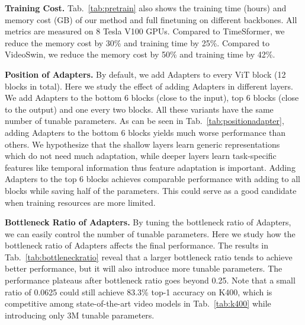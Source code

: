 \documentclass{article} \usepackage{iclr2023_conference,times}
\begin{document}
	\textbf{Training Cost.} Tab.\ \ref{tab:pretrain} also shows the training time (hours) and memory cost (GB) of our method and full finetuning on different backbones. All metrics are measured on 8 Tesla V100 GPUs. Compared to TimeSformer, we reduce the memory cost by 30\% and training time by 25\%. Compared to VideoSwin, we reduce the memory cost by 50\% and training time by 42\%.


\textbf{Position of Adapters.} By default, we add Adapters to every ViT block (12 blocks in total). Here we study the effect of adding Adapters in different layers. We add Adapters to the bottom 6 blocks (close to the input), top 6 blocks (close to the output) and one every two blocks. All these variants have the same number of tunable parameters.
	As can be seen in Tab.\ \ref{tab:positionadapter},  adding Adapters to the bottom 6 blocks yields much worse performance than others. We hypothesize that the shallow layers learn generic representations which do not need much adaptation, while deeper layers learn task-specific features like temporal information thus feature adaptation is important. 
	Adding Adapters to the top 6 blocks achieves comparable performance with adding to all blocks while saving half of the parameters. 
	This could serve as a good candidate when training resources are more limited. 


	\textbf{Bottleneck Ratio of Adapters.} 
	By tuning the bottleneck ratio of Adapters, we can easily control the number of tunable parameters. 
	Here we study how the bottleneck ratio of Adapters affects the final performance. 
	The results in Tab.\ \ref{tab:bottleneckratio} reveal that a larger bottleneck ratio tends to achieve better performance, but it will also introduce more tunable parameters. 
	The performance plateaus after bottleneck ratio goes beyond 0.25. Note that a small ratio of 0.0625 could still achieve 83.3\% top-1 accuracy on K400, which is competitive among state-of-the-art video models in Tab.\ \ref{tab:k400} while introducing only 3M tunable parameters.
	
\end{document}
